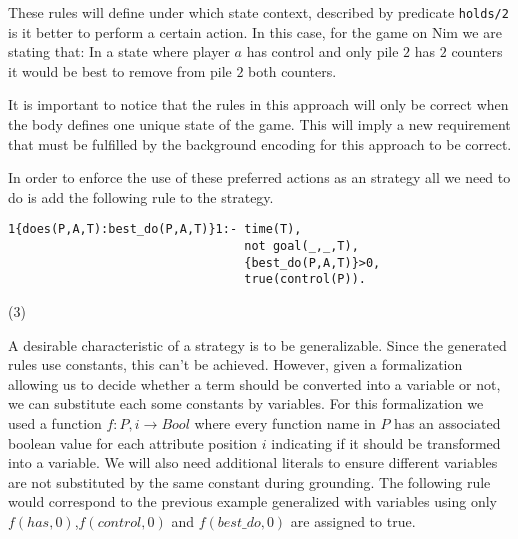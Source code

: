 These rules will define under which state context, described by predicate \texttt{holds/2} is it better to perform a certain action. In this case, for the game on Nim we are stating that: In a state where player $a$ has control and only pile $2$ has $2$ counters it would be best to remove from pile $2$ both counters. 

It is important to notice that the rules in this approach will only be correct when the body defines one unique state of the game. This will imply a new requirement that must be fulfilled by the background encoding for this approach to be correct.

In order to enforce the use of these preferred actions as an strategy all we need to do is add the following rule to the strategy.

\vspace{30px}

\begin{minipage}{0.90\textwidth}
  \vspace{5px}
  \begin{verbatim}
1{does(P,A,T):best_do(P,A,T)}1:- time(T),
                                 not goal(_,_,T),
                                 {best_do(P,A,T)}>0,
                                 true(control(P)).
  \end{verbatim}
  \hfill
\end{minipage}
\begin{minipage}{0.05\textwidth}
  \hfill (3)
  \vspace{30px}
\end{minipage}


A desirable characteristic of a strategy is to be generalizable. Since the generated rules use constants, this can't be achieved. However, given a formalization allowing us to decide whether a term should be converted into a variable or not, we can substitute each some constants by variables. For this formalization we used a function $f:P,i \to Bool$ where every function name in $P$ has an associated boolean value for each attribute position $i$ indicating if it should be transformed into a variable. We will also need additional literals to ensure different variables are not substituted by the same constant during grounding. The following rule would correspond to the previous example generalized with variables using only $f(has,0)$,$f(control,0) $ and $f(best\_do,0)$ are assigned to true. 


\vspace{30px}

